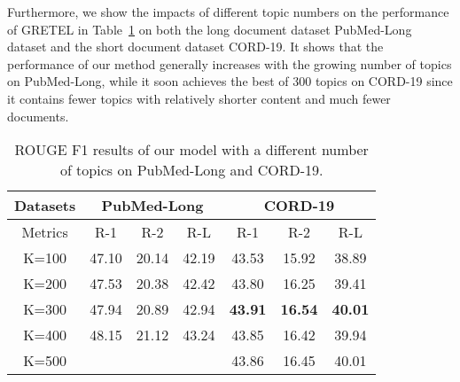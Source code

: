 \documentclass[11pt]{article}
\begin{document}
Furthermore, we show the impacts of different topic numbers on the performance of GRETEL in Table~\ref{tab:topic} on both the long document dataset PubMed-Long dataset and the short document dataset CORD-19.
It shows that the performance of our method generally increases with the growing number of topics on PubMed-Long, while it soon achieves the best of 300 topics on CORD-19 since it contains fewer topics with relatively shorter content and much fewer documents.
\begin{table}[!hbt]
\scriptsize
    \centering
\begin{tabular}{c|c|c|c|c|c|c}
    \hline
    \bf{Datasets}  & \multicolumn{3}{c|}{\bf{PubMed-Long}} & \multicolumn{3}{c}{\bf{CORD-19}}\\ 
    \hline
    Metrics&	R-1&	R-2&	R-L&R-1&R-2&R-L\\
    \hline
    K=100&47.10&20.14&42.19&43.53&15.92&38.89\\
    K=200&47.53&20.38&42.42&43.80&16.25&39.41\\
    K=300&47.94&20.89&42.94&\textbf{43.91}&\textbf{16.54}&\textbf{40.01}\\
    K=400&48.15&21.12&43.24&43.85&16.42&39.94\\
K=500&&&&43.86&16.45&40.01\\
    \hline
    \end{tabular}
\caption{ROUGE F1 results of our model with a different number of topics on PubMed-Long and CORD-19.}
    \label{tab:topic}
\end{table}
\end{document}
